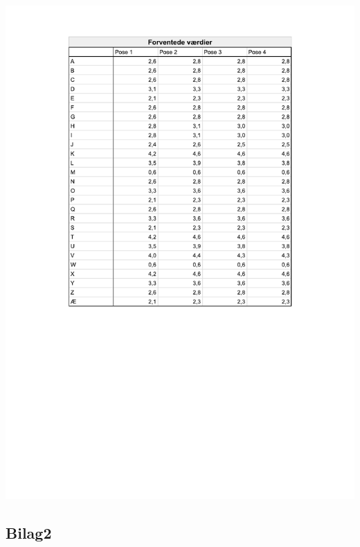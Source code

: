 \documentclass[]{article}
\begin{document}
\begin{center}
\includegraphics[width=8in]{tabeller/ForventedeVardierUdenInddeling.pdf}
\end{center}

\subsection{Bilag2}\label{bilag2}
\end{document}
